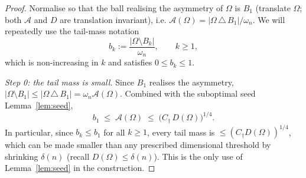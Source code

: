 \documentclass[11pt]{amsart}
\theoremstyle{definition}
\newcommand{\Om}{\Omega}
\newcommand{\Fr}{\mathcal A}
\newcommand{\abs}[1]{\left|#1\right|}
\begin{document}
\begin{proof}
Normalise so that the ball realising the asymmetry of $\Om$ is $B_1$
(translate $\Om$; both $\Fr$ and $D$ are translation invariant), i.e.
$\Fr(\Om)=\abs{\Om\,\triangle\,B_1}/\omega_n$.
We will repeatedly use the tail-mass notation
\begin{equation}\label{eq:bk-def}
   b_k:=\frac{\abs{\Om\setminus B_k}}{\omega_n},\qquad k\ge1,
\end{equation}
which is non-increasing in $k$ and satisfies $0\le b_k\le1$.

\smallskip
\emph{Step 0: the tail mass is small.}
Since $B_1$ realises the asymmetry,
$\abs{\Om\setminus B_1}\le\abs{\Om\,\triangle\,B_1}=\omega_n\Fr(\Om)$.
Combined with the suboptimal seed Lemma~\ref{lem:seed},
\begin{equation}\label{eq:b1-small}
   b_1\;\le\;\Fr(\Om)\;\le\;\bigl(C_\dagger\,D(\Om)\bigr)^{1/4}.
\end{equation}
In particular, since $b_k\le b_1$ for all $k\ge1$, every tail mass is
$\le(C_\dagger D(\Om))^{1/4}$, which can be made smaller than any
prescribed dimensional threshold by shrinking $\delta(n)$ (recall
$D(\Om)\le\delta(n)$). This is the only use of Lemma~\ref{lem:seed} in
the construction.


\end{proof}
\end{document}
